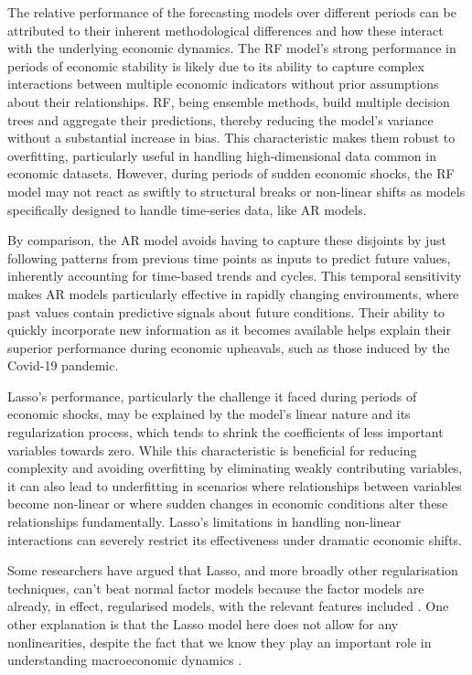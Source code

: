 The relative performance of the forecasting models over different periods can be attributed to their inherent methodological differences and how these interact with the underlying economic dynamics. The RF model's strong performance in periods of economic stability is likely due to its ability to capture complex interactions between multiple economic indicators without prior assumptions about their relationships. RF, being ensemble methods, build multiple decision trees and aggregate their predictions, thereby reducing the model's variance without a substantial increase in bias. This characteristic makes them robust to overfitting, particularly useful in handling high-dimensional data common in economic datasets. However, during periods of sudden economic shocks, the RF model may not react as swiftly to structural breaks or non-linear shifts as models specifically designed to handle time-series data, like AR models.

By comparison, the AR model avoids having to capture these disjoints by just following patterns from previous time points as inputs to predict future values, inherently accounting for time-based trends and cycles. This temporal sensitivity makes AR models particularly effective in rapidly changing environments, where past values contain predictive signals about future conditions. Their ability to quickly incorporate new information as it becomes available helps explain their superior performance during economic upheavals, such as those induced by the Covid-19 pandemic.

Lasso’s performance, particularly the challenge it faced during periods of economic shocks, may be explained by the model's linear nature and its regularization process, which tends to shrink the coefficients of less important variables towards zero. While this characteristic is beneficial for reducing complexity and avoiding overfitting by eliminating weakly contributing variables, it can also lead to underfitting in scenarios where relationships between variables become non-linear or where sudden changes in economic conditions alter these relationships fundamentally. Lasso's limitations in handling non-linear interactions can severely restrict its effectiveness under dramatic economic shifts.

Some researchers have argued that Lasso, and more broadly other regularisation techniques, can't beat normal factor models because the factor models are already, in effect, regularised models, with the relevant features included \autocite{GouletCoulombe2022HowForecasting}. One other explanation is that the Lasso model here does not allow for any nonlinearities, despite the fact that we know they play an important role in understanding macroeconomic dynamics \autocite{Forbes2022LowWorld}.

